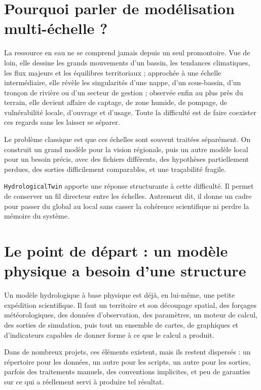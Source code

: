 \documentclass[11pt,a4paper]{article}
\newcommand{\hydrot}{\texttt{HydrologicalTwin}}
\begin{document}
\tableofcontents

\section{Pourquoi parler de modélisation multi-échelle ?}

La ressource en eau ne se comprend jamais depuis un seul promontoire. Vue de loin, elle dessine les grands mouvements d'un bassin, les tendances climatiques, les flux majeurs et les équilibres territoriaux ; approchée à une échelle intermédiaire, elle révèle les singularités d'une nappe, d'un sous-bassin, d'un tronçon de rivière ou d'un secteur de gestion ; observée enfin au plus près du terrain, elle devient affaire de captage, de zone humide, de pompage, de vulnérabilité locale, d'ouvrage et d'usage. Toute la difficulté est de faire coexister ces regards sans les laisser se séparer.

Le problème classique est que ces échelles sont souvent traitées séparément. On construit un grand modèle pour la vision régionale, puis un autre modèle local pour un besoin précis, avec des fichiers différents, des hypothèses partiellement perdues, des sorties difficilement comparables, et une traçabilité fragile.

\hydrot{} apporte une réponse structurante à cette difficulté. Il permet de conserver un fil directeur entre les échelles. Autrement dit, il donne un cadre pour passer du global au local sans casser la cohérence scientifique ni perdre la mémoire du système.

\section{Le point de départ : un modèle physique a besoin d'une structure}

Un modèle hydrologique à base physique est déjà, en lui-même, une petite expédition scientifique. Il faut un territoire et son découpage spatial, des forçages météorologiques, des données d'observation, des paramètres, un moteur de calcul, des sorties de simulation, puis tout un ensemble de cartes, de graphiques et d'indicateurs capables de donner forme à ce que le calcul a produit.

Dans de nombreux projets, ces éléments existent, mais ils restent dispersés : un répertoire pour les données, un autre pour les scripts, un autre pour les sorties, parfois des traitements manuels, des conventions implicites, et peu de garanties sur ce qui a réellement servi à produire tel résultat.
\end{document}
